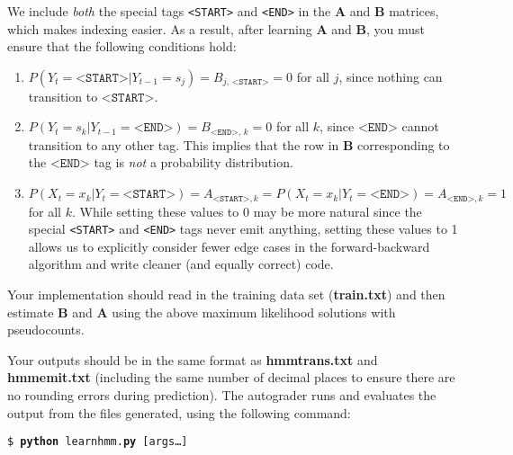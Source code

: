 \documentclass[11pt,addpoints,answers]{exam}
\begin{document}
We include \textit{both} the special tags \texttt{<START>} and \texttt{<END>} in the $\mathbf{A}$ and $\mathbf{B}$ matrices, which makes indexing easier. As a result, after learning $\mathbf{A}$ and $\mathbf{B}$, you must ensure that the following conditions hold:
\begin{enumerate}
    \item $P(Y_t = \texttt{<START>} | Y_{t-1} = s_j) = B_{j, \hspace{2pt}\texttt{<START>}} = 0$ for all $j$, since nothing can transition to $\texttt{<START>}$.
    \item $P(Y_t = s_k | Y_{t-1} = \texttt{<END>}) = B_{\texttt{<END>}, \hspace{2pt}k} = 0$ for all $k$, since $\texttt{<END>}$ cannot transition to any other tag. This implies that the row in $\mathbf{B}$ corresponding to the $\texttt{<END>}$ tag is \textit{not} a probability distribution.
    \item $P(X_t = x_k | Y_t = \texttt{<START>}) = A_{\texttt{<START>}, k} = P(X_t = x_k | Y_t = \texttt{<END>}) = A_{\texttt{<END>}, k} = 1$ for all $k$. While setting these values to $0$ may be more natural since the special \texttt{<START>} and \texttt{<END>} tags never emit anything, setting these values to 1 allows us to explicitly consider fewer edge cases in the forward-backward algorithm and write cleaner (and equally correct) code.
\end{enumerate}

Your implementation should read in the training data set (\textbf{train.txt}) and then estimate $\mathbf{B}$ and $\mathbf{A}$ using the above maximum likelihood solutions with pseudocounts.

Your outputs should be in the same format as \textbf{hmmtrans.txt} and \textbf{hmmemit.txt} (including the same number of decimal places to ensure there are no rounding errors during prediction). The autograder runs and evaluates the output from the files generated, using the following command:

\begin{tabbing}
\=\texttt{\$ \textbf{python} learnhmm.\textbf{py} [args\dots]}\\
\end{tabbing}
\end{document}
